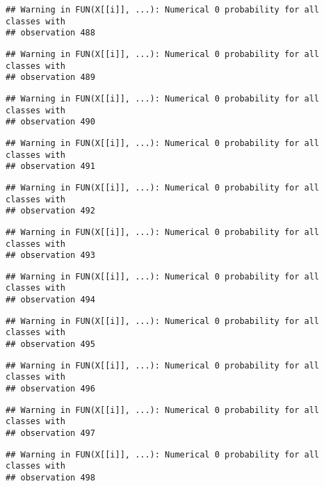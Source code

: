 \documentclass[
]{article}
\begin{document}
\begin{verbatim}
## Warning in FUN(X[[i]], ...): Numerical 0 probability for all classes with
## observation 488
\end{verbatim}

\begin{verbatim}
## Warning in FUN(X[[i]], ...): Numerical 0 probability for all classes with
## observation 489
\end{verbatim}

\begin{verbatim}
## Warning in FUN(X[[i]], ...): Numerical 0 probability for all classes with
## observation 490
\end{verbatim}

\begin{verbatim}
## Warning in FUN(X[[i]], ...): Numerical 0 probability for all classes with
## observation 491
\end{verbatim}

\begin{verbatim}
## Warning in FUN(X[[i]], ...): Numerical 0 probability for all classes with
## observation 492
\end{verbatim}

\begin{verbatim}
## Warning in FUN(X[[i]], ...): Numerical 0 probability for all classes with
## observation 493
\end{verbatim}

\begin{verbatim}
## Warning in FUN(X[[i]], ...): Numerical 0 probability for all classes with
## observation 494
\end{verbatim}

\begin{verbatim}
## Warning in FUN(X[[i]], ...): Numerical 0 probability for all classes with
## observation 495
\end{verbatim}

\begin{verbatim}
## Warning in FUN(X[[i]], ...): Numerical 0 probability for all classes with
## observation 496
\end{verbatim}

\begin{verbatim}
## Warning in FUN(X[[i]], ...): Numerical 0 probability for all classes with
## observation 497
\end{verbatim}

\begin{verbatim}
## Warning in FUN(X[[i]], ...): Numerical 0 probability for all classes with
## observation 498
\end{verbatim}
\end{document}
